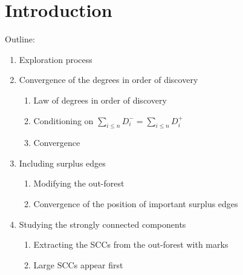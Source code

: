 \section{Introduction}
Outline:
\begin{enumerate}
    \item Exploration process
    \item Convergence of the degrees in order of discovery
    \begin{enumerate}
        \item Law of degrees in order of discovery
        \item Conditioning on $\sum_{i\leq n}D_i^-=\sum_{i\leq n}D_i^+$
        \item Convergence
    \end{enumerate}
    \item Including surplus edges
    \begin{enumerate}
        \item Modifying the out-forest
        \item Convergence of the position of important surplus edges
        \end{enumerate}
    \item Studying the strongly connected components
    \begin{enumerate}
        \item Extracting the SCCs from the out-forest with marks
        \item Large SCCs appear first
        \end{enumerate}
    \end{enumerate}
